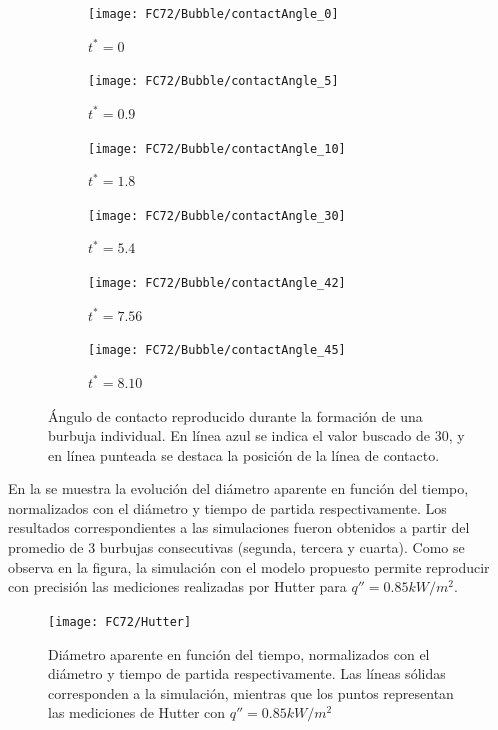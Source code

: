\begin{figure}[htb]
    \centering
    \begin{subfigure}[t]{0.45\textwidth}
        \centering
        \texttt{[image: FC72/Bubble/contactAngle\_0]}
        \caption{$t^*=0$}
    \end{subfigure}
    \vspace{3mm}
    \begin{subfigure}[t]{0.45\textwidth}
        \centering
        \texttt{[image: FC72/Bubble/contactAngle\_5]}
        \caption{$t^*=0.9$}
    \end{subfigure}
    \begin{subfigure}[t]{0.45\textwidth}
        \centering
        \texttt{[image: FC72/Bubble/contactAngle\_10]}
        \caption{$t^*=1.8$}
    \end{subfigure}
    \vspace{3mm}    
    \begin{subfigure}[t]{0.45\textwidth}
        \centering
        \texttt{[image: FC72/Bubble/contactAngle\_30]}
        \caption{$t^*=5.4$}
    \end{subfigure}
    \begin{subfigure}[t]{0.45\textwidth}
        \centering
        \texttt{[image: FC72/Bubble/contactAngle\_42]}
        \caption{$t^*=7.56$}
    \end{subfigure}
    \begin{subfigure}[t]{0.45\textwidth}
        \centering
        \texttt{[image: FC72/Bubble/contactAngle\_45]}
        \caption{$t^*=8.10$}
    \end{subfigure}            
    \caption{\'Angulo de contacto reproducido durante la formaci\'on de una burbuja individual. En l\'inea azul se indica el valor buscado de $30$\textordmasculine, y en l\'inea punteada se destaca la posici\'on de la l\'inea de contacto.}
    \label{fig:evolucion_contacto}
\end{figure}
\FloatBarrier 

En la  se muestra la evoluci\'on del di\'ametro aparente en funci\'on del tiempo, normalizados con el di\'ametro y tiempo de partida respectivamente. Los resultados correspondientes a las simulaciones fueron obtenidos a partir del promedio de 3 burbujas consecutivas (segunda, tercera y cuarta). Como se observa en la figura, la simulaci\'on con el modelo propuesto permite reproducir con precisi\'on las mediciones realizadas por Hutter para $q'' = 0.85kW/m^2$.

\begin{figure}[ht]
	\centering
	\texttt{[image: FC72/Hutter]}
	\caption{Di\'ametro aparente en funci\'on del tiempo, normalizados con el di\'ametro y tiempo de partida respectivamente. Las l\'ineas s\'olidas corresponden a la simulaci\'on, mientras que los puntos representan las mediciones de Hutter con $q'' = 0.85kW/m^2$}
	\label{fig:d_vs_t}
\end{figure}


